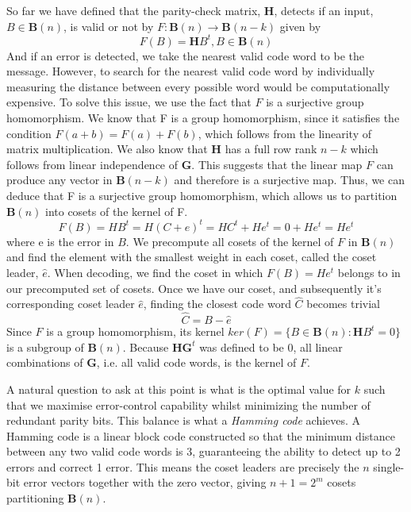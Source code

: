 \documentclass{article}
\begin{document}
So far we have defined that the parity-check matrix, \(\mathbf{H}\), detects if an input, \(B \in 
\mathbf{B}(n)\), is valid or not by \(F: \mathbf{B}(n) \rightarrow \mathbf{B}(n - k)\) given by
\[
    F(B) = \mathbf{H}B^t, B \in \mathbf{B}(n)
\]
And if an error is detected, we take the nearest valid code word to be the message. However, to search 
for the nearest valid code word by individually measuring the distance between every possible word 
would be computationally expensive. To solve this issue, we use the fact that \(F\) is a surjective
group homomorphism. We know that F is a group homomorphism, since it satisfies the condition
\(F(a + b) = F(a) + F(b)\), which follows from the linearity of matrix multiplication. We also know that
\(\mathbf{H}\) has a full row rank \(n - k\) which follows from linear independence of \(\mathbf{G}\). 
This suggests that the linear map \(F\) can produce any vector in \(\mathbf{B}(n - k)\) and therefore is
a surjective map. Thus, we can deduce that F is a surjective group homomorphism, which allows us to 
partition \(\mathbf{B}(n)\) into cosets of the kernel of F.
\[
F(B) = HB^t = H(C + e)^t = HC^t + He^t = 0 + He^t = He^t
\]
where e is the error in \(B\). We precompute all cosets of the kernel of \(F\) in \(\mathbf{B}(n)\) and 
find the element with the smallest weight in each coset, called the coset leader, \(\hat{e}\). When 
decoding, we find the coset in which \(F(B) = He^t\) belongs to in our precomputed set of cosets. Once 
we have our coset, and subsequently it's corresponding coset leader \(\hat{e}\), finding the closest 
code word \(\hat{C}\) becomes trivial
\[
    \hat{C} = B - \hat{e}
\]
Since \(F\) is a group homomorphism, its kernel \(ker(F) = \{B \in \mathbf{B}(n):\mathbf{H}B^t = 0\}\) is
a subgroup of \(\mathbf{B}(n)\). Because \(\mathbf{HG}^t\) was defined to be 0, all linear combinations
of \(\mathbf{G}\), i.e. all valid code words, is the kernel of \(F\).

A natural question to ask at this point is what is the optimal value for \(k\) such that we maximise
error-control capability whilst minimizing the number of redundant parity bits. This balance is what 
a \textit{Hamming code} achieves. A Hamming code is a linear block code constructed so that the minimum 
distance between any two valid code words is 3, guaranteeing the ability to detect up to 2 errors and 
correct 1 error. This means the coset leaders are precisely the \(n\) single-bit error vectors together 
with the zero vector, giving \(n + 1 = 2^m\) cosets partitioning \(\mathbf{B}(n)\).
\end{document}
